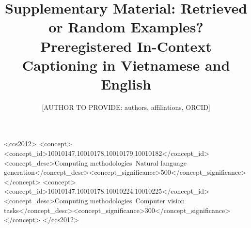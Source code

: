 \documentclass[manuscript,screen]{acmart}
\begin{document}
\title{Supplementary Material: Retrieved or Random Examples? Preregistered In-Context Captioning in Vietnamese and English}
\author{[AUTHOR TO PROVIDE: authors, affiliations, ORCID]}

\begin{CCSXML}
<ccs2012>
<concept><concept_id>10010147.10010178.10010179.10010182</concept_id><concept_desc>Computing methodologies~Natural language generation</concept_desc><concept_significance>500</concept_significance></concept>
<concept><concept_id>10010147.10010178.10010224.10010225</concept_id><concept_desc>Computing methodologies~Computer vision tasks</concept_desc><concept_significance>300</concept_significance></concept>
</ccs2012>
\end{CCSXML}
\maketitle
\setcounter{secnumdepth}{0}\footnotesize\setlength{\tabcolsep}{3pt}


\end{document}
